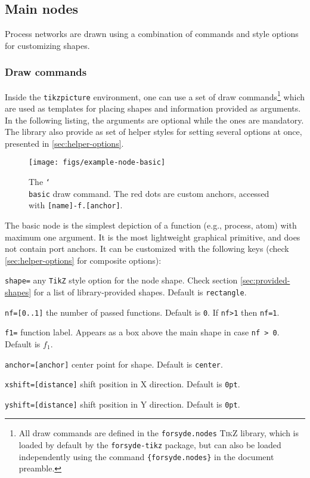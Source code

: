 \subsection{Main nodes}

Process networks are drawn using a combination of commands and style options for customizing shapes. 

\subsubsection{Draw commands}
\label{sec:draw-commands}

Inside the \texttt{tikzpicture} environment, one can use a set of draw commands\footnote{All draw commands are defined in the \texttt{forsyde.nodes} \textsc{TikZ} library, which is loaded by default by the \texttt{forsyde-tikz} package, but can also be loaded independently using the command \texttt{\string\usetikzlibrary\{forsyde.nodes\}} in the document preamble.} which are used as templates for placing shapes and information provided as arguments. In the following listing, the \man{} arguments are optional while the  ones are mandatory. 
The library also provide as set of helper styles for setting several options at once, presented in \ref{sec:helper-options}.


\begin{figure}[htb]\centering
\texttt{[image: figs/example-node-basic]}

\caption{The \texttt{\char`\\basic} draw command. The red dots are custom anchors, accessed with \texttt{[name]-f.[anchor]}.}
\end{figure}
\hspace{1pt}

\noindent The basic node is the simplest depiction of a function (e.g., process, atom) with maximum one argument. It is the most lightweight graphical primitive, and does not contain port anchors. It can be customized with the following keys (check \ref{sec:helper-options} for composite options):

\begin{optionslist}
\item \texttt{shape=} any \texttt{TikZ} style option for the node shape. Check section \ref{sec:provided-shapes} for a list of library-provided shapes. Default is \texttt{rectangle}.
\item \texttt{nf=[0..1]} the number of passed functions. Default is \texttt{0}. If \texttt{nf>1} then \texttt{nf=1}.
\item \texttt{f1=} function label. Appears as a box above the main shape in case \texttt{nf > 0}. Default is $f_1$.
\item \texttt{anchor=[anchor]} center point for shape. Default is \texttt{center}.
\item \texttt{xshift=[distance]} shift position in X direction. Default is \texttt{0pt}.
\item \texttt{yshift=[distance]} shift position in Y direction. Default is \texttt{0pt}.
\end{optionslist}


